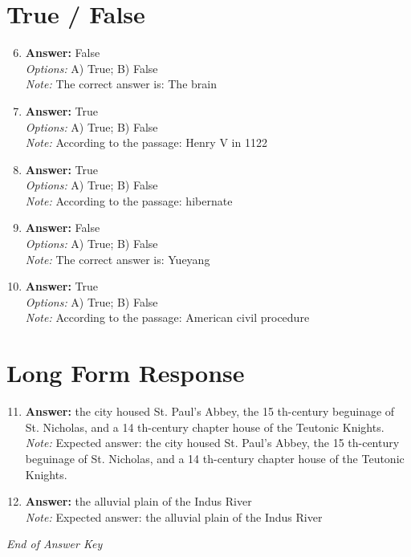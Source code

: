 \documentclass[12pt]{article}
\begin{document}
\section*{True / False}
\begin{enumerate}[label=\arabic*.]
\setcounter{enumi}{5}
\item \textbf{Answer:} False
\\ \textit{Options:} A) True; B) False
\\ \textit{Note:} The correct answer is: The brain
\item \textbf{Answer:} True
\\ \textit{Options:} A) True; B) False
\\ \textit{Note:} According to the passage: Henry V in 1122
\item \textbf{Answer:} True
\\ \textit{Options:} A) True; B) False
\\ \textit{Note:} According to the passage: hibernate
\item \textbf{Answer:} False
\\ \textit{Options:} A) True; B) False
\\ \textit{Note:} The correct answer is: Yueyang
\item \textbf{Answer:} True
\\ \textit{Options:} A) True; B) False
\\ \textit{Note:} According to the passage: American civil procedure
\end{enumerate}

\section*{Long Form Response}
\begin{enumerate}[label=\arabic*.]
\setcounter{enumi}{10}
\item \textbf{Answer:} the city housed St. Paul's Abbey, the 15 th-century beguinage of St. Nicholas, and a 14 th-century chapter house of the Teutonic Knights.
\\ \textit{Note:} Expected answer: the city housed St. Paul's Abbey, the 15 th-century beguinage of St. Nicholas, and a 14 th-century chapter house of the Teutonic Knights.
\item \textbf{Answer:} the alluvial plain of the Indus River
\\ \textit{Note:} Expected answer: the alluvial plain of the Indus River
\end{enumerate}

\vfill
\noindent\textit{End of Answer Key}
\end{document}
